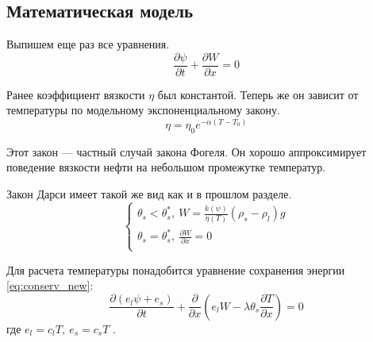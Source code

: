\documentclass[12pt,a4paper]{article}
\newcommand{\pd}[2]{\frac{\partial #1}{\partial #2}}
\begin{document}
\subsection{Математическая модель}

Выпишем еще раз все уравнения.
$$
\pd{\psi}{t} + \pd{W}{x} = 0
$$

Ранее коэффициент вязкости $\eta$ был константой. Теперь же он зависит от температуры по модельному экспоненциальному закону.
\begin{equation}
\eta = \eta_0 e^{-\alpha(T - T_{0})}
\label{viscos}
\end{equation}

Этот закон --- частный случай закона Фогеля. Он хорошо аппроксимирует поведение вязкости нефти на небольшом промежутке температур.

Закон Дарси имеет такой же вид как и в прошлом разделе.
$$
\begin{cases}
\theta_s < \theta_s^*,\  W = \frac{k(\psi)}{\eta(T)} (\rho_s - \rho_l) g\\
\theta_s = \theta_s^*,\  \pd{W}{x} = 0\\
\end{cases}
$$

Для расчета температуры понадобится уравнение сохранения энергии \eqref{eq:conserv_new}:
$$
\pd{(e_l\psi+e_s)}{t} + \pd{}{x}(e_l W - \lambda\theta_s\pd{T}{x}) = 0
$$
где $ e_l =  c_l T,\ e_s =  c_s T $ .
\end{document}
